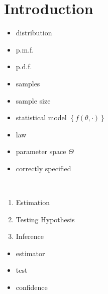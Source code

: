 \section{Introduction}\label{sec:introduction}

\begin{itemize}
    \item distribution
    \item p.m.f.
    \item p.d.f.
    \item samples
    \item sample size
    \item statistical model $\left\{ f(\theta, \cdot) \right\}$
    \item law
    \item parameter space $\Theta$
    \item correctly specified
\end{itemize}

\begin{goal}\,
    \begin{enumerate}
        \item Estimation
        \item Testing Hypothesis
        \item Inference
    \end{enumerate}
\end{goal}

\begin{itemize}
    \item estimator
    \item test
    \item confidence
\end{itemize}